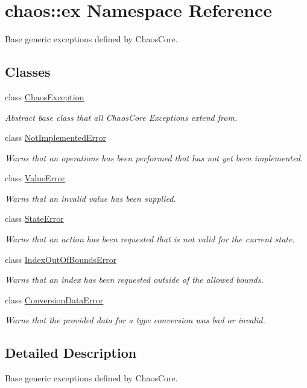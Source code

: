 \hypertarget{namespacechaos_1_1ex}{\section{chaos\-:\-:ex Namespace Reference}
\label{namespacechaos_1_1ex}
}


Base generic exceptions defined by Chaos\-Core.  


\subsection*{Classes}
\begin{DoxyCompactItemize}
\item 
class \hyperlink{classchaos_1_1ex_1_1_chaos_exception}{Chaos\-Exception}
\begin{DoxyCompactList}\small\item\em Abstract base class that all Chaos\-Core Exceptions extend from. \end{DoxyCompactList}\item 
class \hyperlink{classchaos_1_1ex_1_1_not_implemented_error}{Not\-Implemented\-Error}
\begin{DoxyCompactList}\small\item\em Warns that an operations has been performed that has not yet been implemented. \end{DoxyCompactList}\item 
class \hyperlink{classchaos_1_1ex_1_1_value_error}{Value\-Error}
\begin{DoxyCompactList}\small\item\em Warns that an invalid value has been supplied. \end{DoxyCompactList}\item 
class \hyperlink{classchaos_1_1ex_1_1_state_error}{State\-Error}
\begin{DoxyCompactList}\small\item\em Warns that an action has been requested that is not valid for the current state. \end{DoxyCompactList}\item 
class \hyperlink{classchaos_1_1ex_1_1_index_out_of_bounds_error}{Index\-Out\-Of\-Bounds\-Error}
\begin{DoxyCompactList}\small\item\em Warns that an index has been requested outside of the allowed bounds. \end{DoxyCompactList}\item 
class \hyperlink{classchaos_1_1ex_1_1_conversion_data_error}{Conversion\-Data\-Error}
\begin{DoxyCompactList}\small\item\em Warns that the provided data for a type conversion was bad or invalid. \end{DoxyCompactList}\end{DoxyCompactItemize}


\subsection{Detailed Description}
Base generic exceptions defined by Chaos\-Core. 